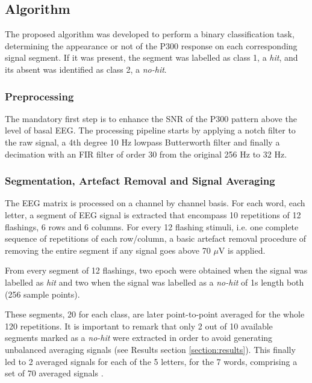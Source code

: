 \documentclass[entropy,article,submit,moreauthors,pdftex,10pt,a4paper]{mdpi}
\begin{document}
\subsection{Algorithm}

The proposed algorithm was developed to perform a binary classification task, determining the appearance or not of the P300 response on each corresponding signal segment.  If it was present, the segment was labelled as class 1, a \textit{hit}, and its absent was identified as class 2, a \textit{no-hit}.

\subsubsection{Preprocessing}

The mandatory first step is to enhance the SNR of the P300 pattern above the level of basal EEG. The processing pipeline starts by applying a notch filter to the raw signal, a 4th degree 10 Hz lowpass Butterworth filter and finally a decimation with an FIR filter of order 30 from the original 256 Hz to 32 Hz.  

\subsubsection{Segmentation, Artefact Removal and Signal Averaging}

The EEG matrix is processed on a channel by channel basis.  For each word, each letter, a segment of EEG signal is extracted that encompass 10 repetitions of 12 flashings, 6 rows and 6 columns.  For every 12 flashing stimuli, i.e. one complete sequence of repetitions of each row/column, a basic artefact removal procedure of removing the entire segment if any signal goes above 70 $\mu$V is applied.

From every segment of 12 flashings, two epoch were obtained when the signal was labelled as \textit{hit} and two when the signal was labelled as a \textit{no-hit} of 1s length both (256 sample points).  

These segments, 20 for each class, are later point-to-point averaged for the whole 120 repetitions. It is important to remark that only 2 out of 10 available segments marked as a \textit{no-hit} were extracted in order to avoid generating unbalanced averaging signals (see Results section \ref{section:results}). This finally led to 2 averaged signals for each of the 5 letters, for the 7 words, comprising a set of 70 averaged signals \citep{Liang2008}.
\end{document}
